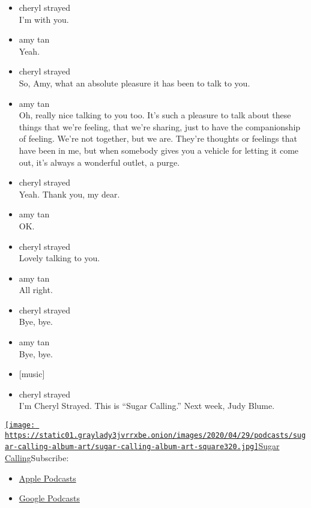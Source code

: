 \begin{itemize}
\item
  cheryl strayed\\
  I'm with you.
\item
  amy tan\\
  Yeah.
\item
  cheryl strayed\\
  So, Amy, what an absolute pleasure it has been to talk to you.
\item
  amy tan\\
  Oh, really nice talking to you too. It's such a pleasure to talk about
  these things that we're feeling, that we're sharing, just to have the
  companionship of feeling. We're not together, but we are. They're
  thoughts or feelings that have been in me, but when somebody gives you
  a vehicle for letting it come out, it's always a wonderful outlet, a
  purge.
\item
  cheryl strayed\\
  Yeah. Thank you, my dear.
\item
  amy tan\\
  OK.
\item
  cheryl strayed\\
  Lovely talking to you.
\item
  amy tan\\
  All right.
\item
  cheryl strayed\\
  Bye, bye.
\item
  amy tan\\
  Bye, bye.
\item
  {[}music{]}
\item
  cheryl strayed\\
  I'm Cheryl Strayed. This is ``Sugar Calling.'' Next week, Judy Blume.
\end{itemize}

\href{https://www.nytimes3xbfgragh.onion/column/sugar-calling}{\texttt{[image: https://static01.graylady3jvrrxbe.onion/images/2020/04/29/podcasts/sugar-calling-album-art/sugar-calling-album-art-square320.jpg]}Sugar
Calling}Subscribe:

\begin{itemize}
\tightlist
\item
  \href{https://itunes.apple.com/us/podcast/id1505881384}{Apple
  Podcasts}
\item
  \href{https://podcasts.google.com/?feed=aHR0cHM6Ly9yc3MuYXJ0MTkuY29tL3N1Z2FyLWNhbGxpbmc\&ved=0CAUQrrcFahcKEwjA8Kyn09voAhUAAAAAHQAAAAAQBQ}{Google
  Podcasts}
\end{itemize}

